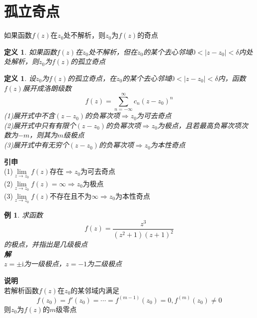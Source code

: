 \documentclass[12pt, a4paper, twoside]{ctexbook}
\newtheorem{definition}[theorem]{定义}
\newtheorem{example}[theorem]{例}
\begin{document}
\section{孤立奇点}
如果函数$f\left(z\right)$在$z_0$处不解析，则$z_0$为$f\left(z\right)$的奇点
\begin{definition}
	如果函数$f\left(z\right)$在$z_0$处不解析，但在$z_0$的某个去心邻域$0<\left|z-z_0\right|<\delta$内处处解析，则$z_0$为$f\left(z\right)$的孤立奇点
\end{definition}
\begin{definition}
	设$z_0$为$f\left(z\right)$的孤立奇点，在$z_0$的某个去心邻域$0<\left|z-z_0\right|<\delta$内，函数$f\left(z\right)$展开成洛朗级数
	$$
	f\left(z\right)=\sum_{n=-\infty}^{\infty}c_{n}\left(z-z_0\right)^n
	$$
	(1)展开式中不含$\left(z-z_0\right)$的负幂次项$\Rightarrow z_0$为可去奇点\\
	(2)展开式中只有有限个$\left(z-z_0\right)$的负幂次项$\Rightarrow z_0$为极点，且若最高负幂次项次数为$-m$，则其为$m$级极点\\
	(3)展开式中有无穷个$\left(z-z_0\right)$的负幂次项$\Rightarrow z_0$为本性奇点
\end{definition}
\textbf{引申}\\
(1)$\lim\limits_{z\to z_0}{f\left(z\right)}$存在$\Rightarrow z_0$为可去奇点\\
(2)$\lim\limits_{z\to z_0}{f\left(z\right)}=\infty \Rightarrow z_0$为极点\\
(3)$\lim\limits_{z\to z_0}{f\left(z\right)}$不存在且不为$\infty \Rightarrow z_0$为本性奇点
\begin{example}
	求函数
	$$
	f\left(z\right)=\frac{z^3}{\left(z^2+1\right)\left(z+1\right)^2}
	$$
	\hspace*{2em}的极点，并指出是几级极点\\
	\hspace*{1em}\textbf{解}\\
	\hspace*{2em}$z=\pm\mathrm{i}$为一级极点，$z=-1$为二级极点
\end{example}
\textbf{说明}\\
若解析函数$f\left(z\right)$在$z_0$的某邻域内满足
$$
f\left(z_0\right)=f'\left(z_0\right)=\cdots =f^{(m-1)}\left(z_0\right)=0,f^{(m)}\left(z_0\right)\neq0
$$
则$z_0$为$f\left(z\right)$的$m$级零点
\newpage
\end{document}
